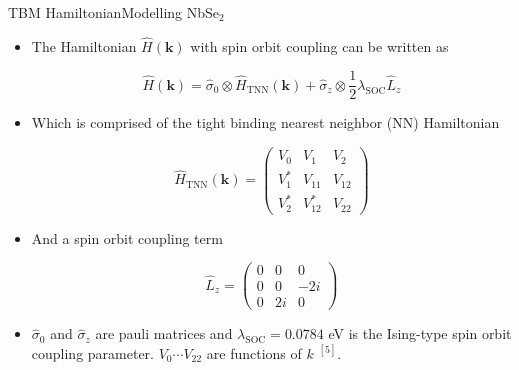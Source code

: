 \documentclass[9pt]{beamer}
\begin{document}
\begin{frame}{TBM Hamiltonian}{Modelling NbSe$_2$}
  \begin{itemize}
    \item{The Hamiltonian $\hat{H}(\boldsymbol{k})$ with spin orbit coupling can be written as

      \begin{equation}
        \hat{H}(\boldsymbol{k})=\hat{\sigma}_{0} \otimes \hat{H}_{\mathrm{TNN}}(\boldsymbol{k})+\hat{\sigma}_{z} \otimes \frac{1}{2} \lambda_{\mathrm{SOC}} \hat{L}_{z}
      \end{equation}
      }

    \item{Which is comprised of the tight binding nearest neighbor (NN) Hamiltonian

      \begin{equation}
        \hat{H}_{\mathrm{TNN}}(\boldsymbol{k})=\left(\begin{array}{ccc}
        V_{0} & V_{1} & V_{2} \\
        V_{1}^{*} & V_{11} & V_{12} \\
        V_{2}^{*} & V_{12}^{*} & V_{22}
        \end{array}\right)
      \end{equation}
      }

    \item{And a spin orbit coupling term

      \begin{equation}
        \hat{L}_{z}=\left(\begin{array}{ccc}
        0 & 0 & 0 \\
        0 & 0 & -2 i \\
        0 & 2 i & 0
        \end{array}\right)
      \end{equation}
    }

  \item $\hat{\sigma}_0$ and $\hat{\sigma}_z$ are pauli matrices and $\lambda_{\text{SOC}}=0.0784$ eV is the Ising-type spin orbit coupling parameter. $V_0 \cdots V_{22}$ are functions of $k$ $^{[5]}$.
  \end{itemize}
\end{frame}
\end{document}

